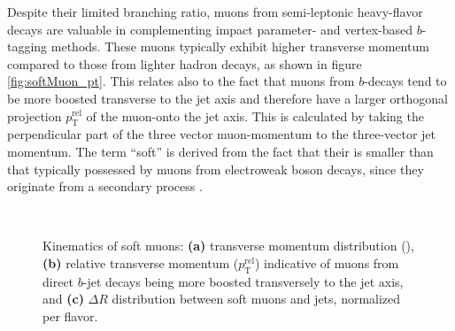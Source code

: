 Despite their limited branching ratio, muons from semi-leptonic heavy-flavor decays are valuable in complementing impact parameter- and vertex-based $b$-tagging methods. These muons typically exhibit higher transverse momentum compared to those from lighter hadron decays, as shown in figure \ref{fig:softMuon_pt}. This relates also to the fact that muons from $b$-decays tend to be more boosted transverse to the jet axis and therefore have a larger orthogonal projection $p_\text{T}^\text{rel}$ of the muon-\pt onto the jet axis. This is calculated by taking the perpendicular part of the three vector muon-momentum to the three-vector jet momentum. The term ``soft'' is derived from the fact that their \pt is smaller than that typically possessed by muons from electroweak boson decays, since they originate from a secondary process \citep{ATL-PHYS-PUB-2017-013}.
\begin{figure}[]
  \centering
  \hspace*{0.5cm}
  \\
  \caption{Kinematics of soft muons: \textbf{(a)} transverse momentum distribution (), \textbf{(b)} relative transverse momentum ($p_\text{T}^\text{rel}$) indicative of muons from direct $b$-jet decays being more boosted transversely to the jet axis, and \textbf{(c)} $\Delta R$ distribution between soft muons and jets, normalized per flavor.}
  \label{fig:muonsForSMT}
\end{figure}



